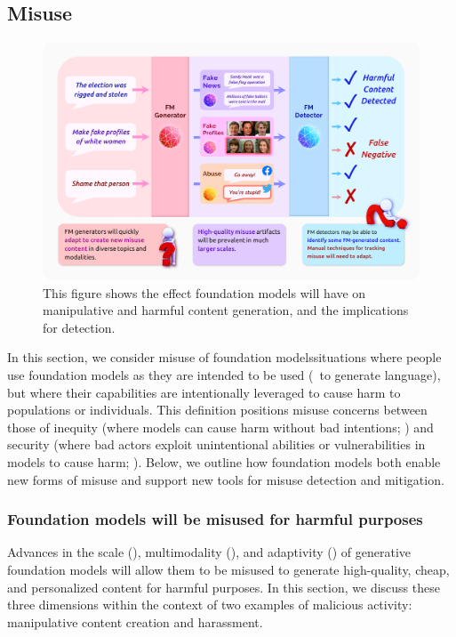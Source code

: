 \newsection
\subsection{Misuse} 
\label{sec:misuse}


\begin{figure}[!ht]
\centering
\includegraphics[width=\linewidth]{society/figures/Misuse.png}
\caption{\label{fig:misuse} This figure shows the effect foundation models will have on manipulative and harmful content generation, and the implications for detection. }
\end{figure}

In this section, we consider misuse of foundation models\dash{}situations where people use foundation models as they are intended to be used (\eg~to generate language), but where their capabilities are intentionally leveraged to cause harm to populations or individuals. This definition positions misuse concerns 
between those of inequity (where models can cause harm without bad intentions; ) and security (where bad actors exploit unintentional abilities or vulnerabilities in models to cause harm; ). 
Below, we outline how foundation models both enable new forms of misuse and support new tools for misuse detection and mitigation. 

\subsubsection{Foundation models will be misused for harmful purposes}
Advances in the scale (),  multimodality (), and adaptivity () of generative foundation models will allow them to be misused to generate high-quality, cheap, and personalized content for harmful purposes. 
In this section, we discuss these three dimensions within the context of two examples of malicious activity: manipulative content creation and harassment. 

